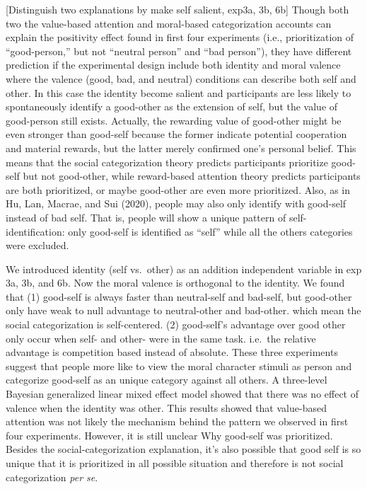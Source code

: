 \documentclass[
  english,
  man]{apa6}
\begin{document}
{[}Distinguish two explanations by make self salient, exp3a, 3b, 6b{]} Though both two the value-based attention and moral-based categorization accounts can explain the positivity effect found in first four experiments (i.e., prioritization of ``good-person,'' but not ``neutral person'' and ``bad person''), they have different prediction if the experimental design include both identity and moral valence where the valence (good, bad, and neutral) conditions can describe both self and other. In this case the identity become salient and participants are less likely to spontaneously identify a good-other as the extension of self, but the value of good-person still exists. Actually, the rewarding value of good-other might be even stronger than good-self because the former indicate potential cooperation and material rewards, but the latter merely confirmed one's personal belief. This means that the social categorization theory predicts participants prioritize good-self but not good-other, while reward-based attention theory predicts participants are both prioritized, or maybe good-other are even more prioritized. Also, as in Hu, Lan, Macrae, and Sui (2020), people may also only identify with good-self instead of bad self. That is, people will show a unique pattern of self-identification: only good-self is identified as ``self'' while all the others categories were excluded.

We introduced identity (self vs.~other) as an addition independent variable in exp 3a, 3b, and 6b. Now the moral valence is orthogonal to the identity. We found that (1) good-self is always faster than neutral-self and bad-self, but good-other only have weak to null advantage to neutral-other and bad-other. which mean the social categorization is self-centered. (2) good-self's advantage over good other only occur when self- and other- were in the same task. i.e.~the relative advantage is competition based instead of absolute. These three experiments suggest that people more like to view the moral character stimuli as person and categorize good-self as an unique category against all others. A three-level Bayesian generalized linear mixed effect model showed that there was no effect of valence when the identity was other. This results showed that value-based attention was not likely the mechanism behind the pattern we observed in first four experiments. However, it is still unclear Why good-self was prioritized. Besides the social-categorization explanation, it's also possible that good self is so unique that it is prioritized in all possible situation and therefore is not social categorization \emph{per se}.
\end{document}
